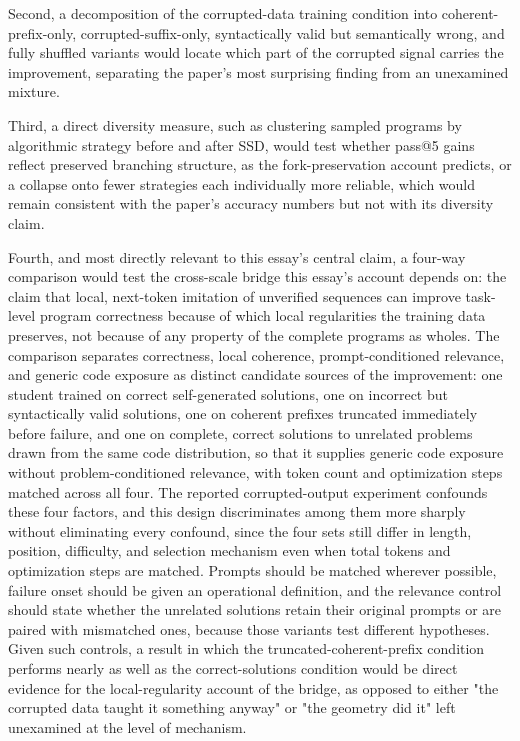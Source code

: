 \documentclass[11pt]{article}
\begin{document}
Second, a decomposition of the corrupted-data training condition into coherent-prefix-only, corrupted-suffix-only, syntactically valid but semantically wrong, and fully shuffled variants would locate which part of the corrupted signal carries the improvement, separating the paper's most surprising finding from an unexamined mixture.

Third, a direct diversity measure, such as clustering sampled programs by algorithmic strategy before and after SSD, would test whether pass@5 gains reflect preserved branching structure, as the fork-preservation account predicts, or a collapse onto fewer strategies each individually more reliable, which would remain consistent with the paper's accuracy numbers but not with its diversity claim.

Fourth, and most directly relevant to this essay's central claim, a four-way comparison would test the cross-scale bridge this essay's account depends on: the claim that local, next-token imitation of unverified sequences can improve task-level program correctness because of which local regularities the training data preserves, not because of any property of the complete programs as wholes. The comparison separates correctness, local coherence, prompt-conditioned relevance, and generic code exposure as distinct candidate sources of the improvement: one student trained on correct self-generated solutions, one on incorrect but syntactically valid solutions, one on coherent prefixes truncated immediately before failure, and one on complete, correct solutions to unrelated problems drawn from the same code distribution, so that it supplies generic code exposure without problem-conditioned relevance, with token count and optimization steps matched across all four. The reported corrupted-output experiment confounds these four factors, and this design discriminates among them more sharply without eliminating every confound, since the four sets still differ in length, position, difficulty, and selection mechanism even when total tokens and optimization steps are matched. Prompts should be matched wherever possible, failure onset should be given an operational definition, and the relevance control should state whether the unrelated solutions retain their original prompts or are paired with mismatched ones, because those variants test different hypotheses. Given such controls, a result in which the truncated-coherent-prefix condition performs nearly as well as the correct-solutions condition would be direct evidence for the local-regularity account of the bridge, as opposed to either "the corrupted data taught it something anyway" or "the geometry did it" left unexamined at the level of mechanism.
\end{document}
